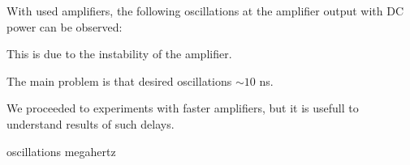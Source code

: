 With used amplifiers, the following oscillations at the amplifier output with DC power can be observed:

\begin{center}
\end{center}

This is due to the instability of the amplifier. 

\phantom{42}

The main problem is that desired oscillations $\sim 10$ ns. \\

\phantom{42}

We proceeded to experiments with faster amplifiers, but it is usefull to understand results of such delays.

oscillations megahertz
